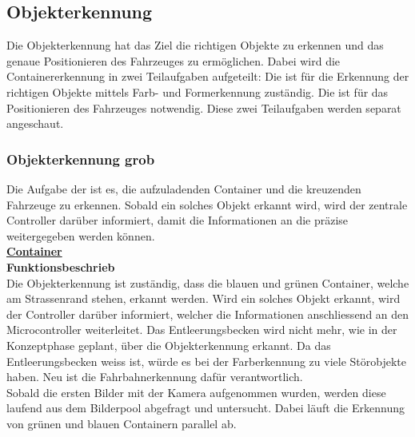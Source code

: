 \subsection{Objekterkennung}
Die Objekterkennung hat das Ziel die richtigen Objekte zu erkennen und das genaue Positionieren des Fahrzeuges zu ermöglichen. Dabei wird die Containererkennung in zwei Teilaufgaben aufgeteilt: Die \grqq{} ist für die Erkennung der richtigen Objekte mittels Farb- und Formerkennung zuständig. Die \grqq{} ist für das Positionieren des Fahrzeuges notwendig. Diese zwei Teilaufgaben werden separat angeschaut.
%
\subsubsection{Objekterkennung grob}
Die Aufgabe der \grqq{} ist es, die aufzuladenden Container und die kreuzenden Fahrzeuge zu erkennen. Sobald ein solches Objekt erkannt wird, wird der zentrale Controller darüber informiert, damit die Informationen an die \grqq{} präzise weitergegeben werden können.
\\[0.2cm]
\underline{\textbf{Container}}
\\[0.2cm]
\textbf{Funktionsbeschrieb}\\[0.2cm]
Die Objekterkennung ist zuständig, dass die blauen und grünen Container, welche am Strassenrand stehen, erkannt werden. Wird ein solches Objekt erkannt, wird der Controller darüber informiert, welcher die Informationen anschliessend an den Microcontroller weiterleitet. Das Entleerungsbecken wird nicht mehr, wie in der Konzeptphase geplant, über die Objekterkennung erkannt. Da das Entleerungsbecken weiss ist, würde es bei der Farberkennung zu viele Störobjekte haben. Neu ist die Fahrbahnerkennung dafür verantwortlich.
\\[0.2cm]
Sobald die ersten Bilder mit der Kamera aufgenommen wurden, werden diese laufend aus dem Bilderpool abgefragt und untersucht. Dabei läuft die Erkennung von grünen und blauen Containern parallel ab.

